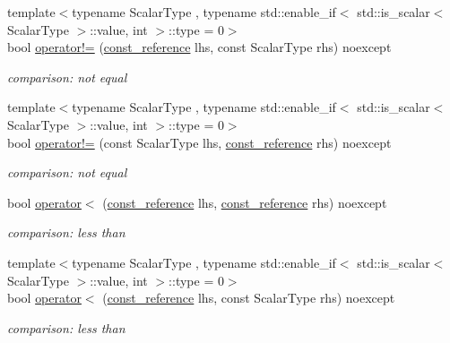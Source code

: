 \begin{DoxyCompactItemize}
{\footnotesize template$<$typename Scalar\+Type , typename std\+::enable\+\_\+if$<$ std\+::is\+\_\+scalar$<$ Scalar\+Type $>$\+::value, int $>$\+::type  = 0$>$ }\\bool \hyperlink{classnlohmann_1_1basic__json_afefc38fc08bdb7a9a7474b5ab4a1140f}{operator!=} (\hyperlink{classnlohmann_1_1basic__json_a4057c5425f4faacfe39a8046871786ca}{const\+\_\+reference} lhs, const Scalar\+Type rhs) noexcept
\begin{DoxyCompactList}\small\item\em comparison\+: not equal \end{DoxyCompactList}\item 
{\footnotesize template$<$typename Scalar\+Type , typename std\+::enable\+\_\+if$<$ std\+::is\+\_\+scalar$<$ Scalar\+Type $>$\+::value, int $>$\+::type  = 0$>$ }\\bool \hyperlink{classnlohmann_1_1basic__json_ab0e886db6e9fa91ff9fd853333fed05b}{operator!=} (const Scalar\+Type lhs, \hyperlink{classnlohmann_1_1basic__json_a4057c5425f4faacfe39a8046871786ca}{const\+\_\+reference} rhs) noexcept
\begin{DoxyCompactList}\small\item\em comparison\+: not equal \end{DoxyCompactList}\item 
bool \hyperlink{classnlohmann_1_1basic__json_aacd442b66140c764c594ac8ad7dfd5b3}{operator$<$} (\hyperlink{classnlohmann_1_1basic__json_a4057c5425f4faacfe39a8046871786ca}{const\+\_\+reference} lhs, \hyperlink{classnlohmann_1_1basic__json_a4057c5425f4faacfe39a8046871786ca}{const\+\_\+reference} rhs) noexcept
\begin{DoxyCompactList}\small\item\em comparison\+: less than \end{DoxyCompactList}\item 
{\footnotesize template$<$typename Scalar\+Type , typename std\+::enable\+\_\+if$<$ std\+::is\+\_\+scalar$<$ Scalar\+Type $>$\+::value, int $>$\+::type  = 0$>$ }\\bool \hyperlink{classnlohmann_1_1basic__json_a7999ee3a69a4979d92e98ab1e88c8759}{operator$<$} (\hyperlink{classnlohmann_1_1basic__json_a4057c5425f4faacfe39a8046871786ca}{const\+\_\+reference} lhs, const Scalar\+Type rhs) noexcept
\begin{DoxyCompactList}\small\item\em comparison\+: less than \end{DoxyCompactList}\item 

\end{DoxyCompactItemize}
